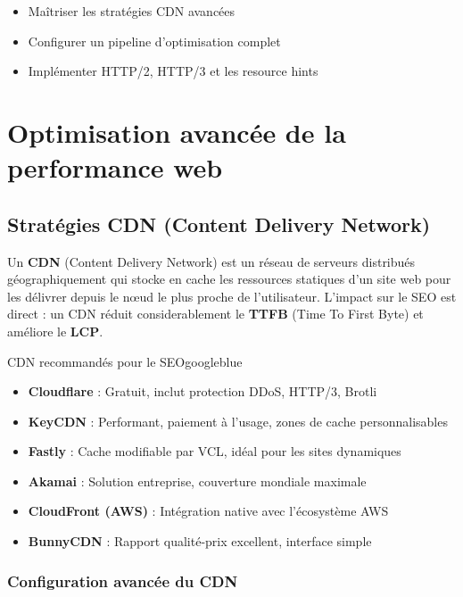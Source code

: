 \documentclass[12pt,a4paper,twoside]{report}
\newcommand{\keyword}[1]{\textbf{\textcolor{googleblue}{#1}}}
\newcommand{\important}[1]{\textbf{\textcolor{googlered}{#1}}}
\newcommand{\level}[1]{\medskip\bigskip}
\begin{document}
\level{3}
\begin{objectives}
\begin{itemize}
    \item Maîtriser les stratégies CDN avancées
    \item Configurer un pipeline d'optimisation complet
    \item Implémenter HTTP/2, HTTP/3 et les resource hints
\end{itemize}
\end{objectives}

\chapter{Optimisation avancée de la performance web}
\label{ch:perfweb}

\section{Stratégies CDN (Content Delivery Network)}

Un \keyword{CDN} (Content Delivery Network) est un réseau de serveurs distribués géographiquement qui stocke en cache les ressources statiques d'un site web pour les délivrer depuis le nœud le plus proche de l'utilisateur. L'impact sur le SEO est direct : un CDN réduit considerablement le \important{TTFB} (Time To First Byte) et améliore le \keyword{LCP}.

\begin{mybox}{CDN recommandés pour le SEO}{googleblue}
\begin{itemize}
    \item \textbf{Cloudflare} : Gratuit, inclut protection DDoS, HTTP/3, Brotli
    \item \textbf{KeyCDN} : Performant, paiement à l'usage, zones de cache personnalisables
    \item \textbf{Fastly} : Cache modifiable par VCL, idéal pour les sites dynamiques
    \item \textbf{Akamai} : Solution entreprise, couverture mondiale maximale
    \item \textbf{CloudFront (AWS)} : Intégration native avec l'écosystème AWS
    \item \textbf{BunnyCDN} : Rapport qualité-prix excellent, interface simple
\end{itemize}
\end{mybox}

\subsection{Configuration avancée du CDN}
\end{document}
